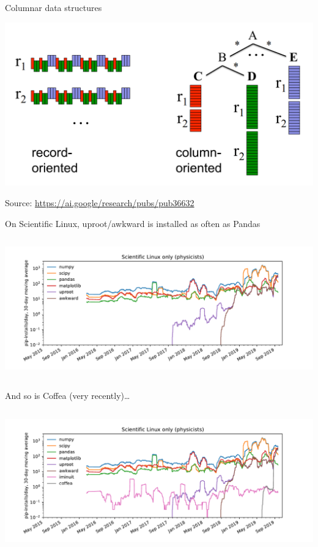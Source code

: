 \documentclass[aspectratio=169]{beamer}
\begin{document}
\begin{frame}{Columnar data structures}
\begin{center}
\includegraphics[width=0.95\linewidth]{google-dremel-fig1.png}
\end{center}

Source: \textcolor{blue}{\url{https://ai.google/research/pubs/pub36632}}
\end{frame}

\begin{frame}{On Scientific Linux, uproot/awkward is installed as often as Pandas}
\vspace{0.5 cm}
\begin{columns}
\includegraphics[width=\linewidth]{pip-scilinux-uproot.pdf}
\end{columns}
\end{frame}

\begin{frame}{And so is Coffea (very recently)\ldots}
\vspace{0.5 cm}
\begin{columns}
\includegraphics[width=\linewidth]{pip-scilinux-uproot-iminuit.pdf}
\end{columns}
\end{frame}
\end{document}

